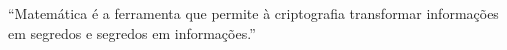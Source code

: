 ``Matemática é a ferramenta que permite à criptografia transformar informações em segredos e segredos em informações.''

